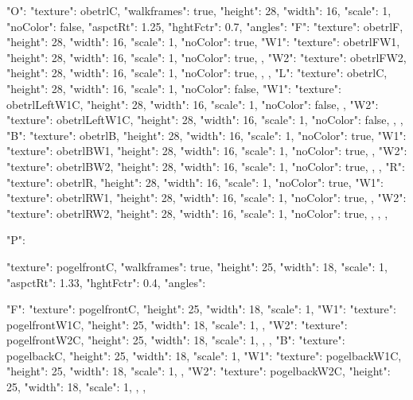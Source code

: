 {  "O": {
    "texture": obetrlC,
    "walkframes": true,
    "height": 28,
    "width": 16,
    "scale": 1,
    "noColor": false,
    "aspctRt": 1.25,
    "hghtFctr": 0.7,
    "angles":{
      "F": {
        "texture": obetrlF,
        "height": 28,
        "width": 16,
        "scale": 1,
        "noColor": true,
        "W1": {
          "texture": obetrlFW1,
          "height": 28,
          "width": 16,
          "scale": 1,
          "noColor": true,
        },
        "W2": {
          "texture": obetrlFW2,
          "height": 28,
          "width": 16,
          "scale": 1,
          "noColor": true,
        },
      },
      "L": {
        "texture": obetrlC,
        "height": 28,
        "width": 16,
        "scale": 1,
        "noColor": false,
        "W1": {
          "texture": obetrlLeftW1C,
          "height": 28,
          "width": 16,
          "scale": 1,
          "noColor": false,
        },
        "W2": {
          "texture": obetrlLeftW1C,
          "height": 28,
          "width": 16,
          "scale": 1,
          "noColor": false,
        },
      },
      "B": {
        "texture": obetrlB,
        "height": 28,
        "width": 16,
        "scale": 1,
        "noColor": true,
        "W1": {
          "texture": obetrlBW1,
          "height": 28,
          "width": 16,
          "scale": 1,
          "noColor": true,
        },
        "W2": {
          "texture": obetrlBW2,
          "height": 28,
          "width": 16,
          "scale": 1,
          "noColor": true,
        },
      },
      "R": {
        "texture": obetrlR,
        "height": 28,
        "width": 16,
        "scale": 1,
        "noColor": true,
        "W1": {
          "texture": obetrlRW1,
          "height": 28,
          "width": 16,
          "scale": 1,
          "noColor": true,
        },
        "W2": {
          "texture": obetrlRW2,
          "height": 28,
          "width": 16,
          "scale": 1,
          "noColor": true,
        },
      },
    }
  },

  "P": {
    "texture": pogelfrontC,
    "walkframes": true,
    "height": 25,
    "width": 18,
    "scale": 1,
    "aspctRt": 1.33,
    "hghtFctr": 0.4,
    "angles":{
      "F": {
        "texture": pogelfrontC,
        "height": 25,
        "width": 18,
        "scale": 1,
        "W1": {
          "texture": pogelfrontW1C,
          "height": 25,
          "width": 18,
          "scale": 1,
        },
        "W2": {
          "texture": pogelfrontW2C,
          "height": 25,
          "width": 18,
          "scale": 1,
        },
      },
      "B": {
        "texture": pogelbackC,
        "height": 25,
        "width": 18,
        "scale": 1,
        "W1": {
          "texture": pogelbackW1C,
          "height": 25,
          "width": 18,
          "scale": 1,
        },
        "W2": {
          "texture": pogelbackW2C,
          "height": 25,
          "width": 18,
          "scale": 1,
        },
      },

}}}
